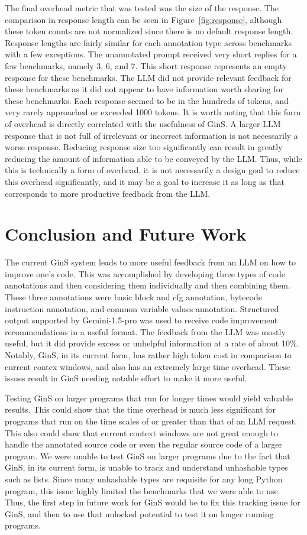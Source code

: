 \documentclass[sigconf]{acmart}
\begin{document}
The final overhead metric that was tested was the size of the response.
The comparison in response length can be seen in Figure~\ref{fig:response}, although these token counts are not normalized since there is no default response length.
Response lengths are fairly similar for each annotation type across benchmarks with a few exceptions.
The unannotated prompt received very short replies for a few benchmarks, namely 3, 6, and 7.
This short response represents an empty response for these benchmarks.
The LLM did not provide relevant feedback for these benchmarks as it did not appear to have information worth sharing for these benchmarks.
Each response seemed to be in the hundreds of tokens, and very rarely approached or exceeded 1000 tokens.
It is worth noting that this form of overhead is directly correlated with the usefulness of GinS.
A larger LLM response that is not full of irrelevant or incorrect information is not necessarily a worse response.
Reducing response size too significantly can result in greatly reducing the amount of information able to be conveyed by the LLM.
Thus, while this is technically a form of overhead, it is not necessarily a design goal to reduce this overhead significantly, and it may be a goal to increase it as long as that corresponds to more productive feedback from the LLM.


\section{Conclusion and Future Work}
The current GinS system leads to more useful feedback from an LLM on how to improve one's code.
This was accomplished by developing three types of code annotations and then considering them individually and then combining them.
These three annotations were basic block and cfg annotation, bytecode instruction annotation, and common variable values annotation.
Structured output supported by Gemini-1.5-pro was used to receive code improvement recommendations in a useful format.
The feedback from the LLM was mostly useful, but it did provide excess or unhelpful information at a rate of about 10\%.
Notably, GinS, in its current form, has rather high token cost in comparison to current contex windows, and also has an extremely large time overhead.
These issues result in GinS needing notable effort to make it more useful.

Testing GinS on larger programs that run for longer times would yield valuable results.
This could show that the time overhead is much less significant for programs that run on the time scales of or greater than that of an LLM request.
This also could show that current context windows are not great enough to handle the annotated source code or even the regular source code of a larger program.
We were unable to test GinS on larger programs due to the fact that GinS, in its current form, is unable to track and understand unhashable types such as lists.
Since many unhashable types are requisite for any long Python program, this issue highly limited the benchmarks that we were able to use.
Thus, the first step in future work for GinS would be to fix this tracking issue for GinS, and then to use that unlocked potential to test it on longer running programs.




\end{document}
